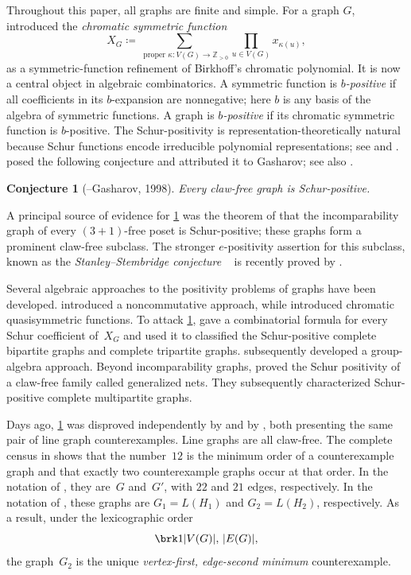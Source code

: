 \documentclass[11pt]{amsart}
\numberwithin{equation}{section}
\newtheorem{conjecture}[lemma]{Conjecture}
\theoremstyle{remark}
\newcommand{\CSF}{X}
\newcommand{\Gtwo}{G_{2}}
\newcommand{\Gone}{G_{1}}
\begin{document}
Throughout this paper, all graphs are finite and simple.
For a graph $G$, 
\citet{Stanley1995} introduced the \emph{chromatic symmetric
function} 
\[
\CSF_G\coloneqq
\sum_{\text{ proper }\kappa\colon V(G)\to\mathbb Z_{>0}}
\prod_{u\in V(G)}x_{\kappa(u)},
\]
as a symmetric-function refinement of Birkhoff's chromatic polynomial. 
It is now a central object in algebraic combinatorics. A symmetric function is \emph{$b$-positive} if all coefficients
in its $b$-expansion are nonnegative; here $b$ is any basis of the algebra of symmetric functions. A graph is \emph{$b$-positive} if
its chromatic symmetric function is $b$-positive.  The Schur-positivity is
representation-theoretically natural because Schur functions encode
irreducible polynomial representations; see
\citet[pp.~162--163]{Macdonald1995} and \citet{Stanley1981,Stanley1999}. \citet{Stanley1998} posed 
the following conjecture and attributed it
to Gasharov; see also \citet{Gasharov1999}.
\begin{conjecture}[\citeauthor{Stanley1998}--Gasharov, 1998]\label{conj:SG}
Every claw-free graph is Schur-positive.
\end{conjecture}
A principal source of evidence for \cref{conj:SG} was the theorem of
\citet{Gasharov1996} that the incomparability graph of every $(3+1)$-free
poset is Schur-positive; these graphs form a prominent claw-free subclass.
The stronger $e$-positivity assertion for this subclass, known as
the \emph{Stanley--Stembridge conjecture}
~\cite{StanleyStembridge1993} is recently proved by \citet{Hikita2025}.

Several algebraic approaches to the positivity problems of graphs have been developed.
\citet{GebhardSagan2001} introduced a noncommutative approach, while
\citet{ShareshianWachs2016} introduced chromatic quasisymmetric functions.
To attack \cref{conj:SG}, \citet{WangWang2020} gave a
combinatorial formula for every Schur coefficient of~$\CSF_G$ and used it
to classified the Schur-positive
complete bipartite graphs and complete tripartite graphs.  \citet{Pawlowski2022}
subsequently developed a group-algebra approach.
Beyond incomparability graphs, \citet{ShelburneVanWilligenburg2025} proved
the Schur positivity of a claw-free family called generalized nets. They \citep{ShelburneVanWilligenburg2026} subsequently characterized
Schur-positive complete multipartite graphs.

Days ago, \cref{conj:SG} was disproved independently by
\citet{Prajapati2026} and by \citet{MM2026}, both presenting the same pair of line graph counterexamples. Line graphs are all claw-free.
The complete census in
\citet[Proposition~4]{Prajapati2026} shows that the number~$12$ is the minimum
order of a counterexample graph and that exactly two counterexample graphs occur at that order.  
In the notation of \citet{Prajapati2026}, they are~$G$
and~$G'$,
with $22$ and $21$ edges,
respectively.
In the notation of
\citet{MM2026}, these graphs are
$\Gone=L(H_1)$ and $\Gtwo=L(H_2)$, 
respectively.
As a result, under the lexicographic order
\[
\brk1{\lvert V(G)\rvert,\,\lvert E(G)\rvert},
\]
the graph~$\Gtwo$ is the unique
\emph{vertex-first, edge-second minimum} counterexample.
\end{document}
